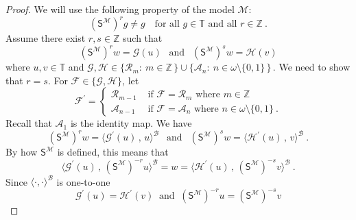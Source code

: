 \documentclass[10pt,a4paper, openany,  oldfontcommands]{memoir}
\newtheorem{open problem} [theorem] {Open Problem}
\newtheorem{open question} [theorem] {Open Question}
\renewcommand{\mathrm}{\mathsf}
\begin{document}
\begin{proof}
 
 We will use the following property of the model  $  \mathcal{M} $: 
 \[
  \left(   \mathrm{S}^{  \mathcal{M}  }  \right)^r    g   \neq   g  
 \      \       \      \mbox{  for all }   g  \in  \mathbb{T} 
  \mbox{  and    all }   r  \in  \mathbb{Z}
  \         .      \tag{*}  
 \]
Assume  there exist  $  r, s  \in   \mathbb{Z}  $    such that  
\[
 \left(   \mathrm{S}^{  \mathcal{M}  }  \right)^r    w   =     \mathcal{G} \left( u  \right)  
\        \      \mbox{  and  }      \       \  
 \left(   \mathrm{S}^{  \mathcal{M}  }  \right)^s    w   =     \mathcal{H} \left( v  \right)   
\]
where   $  u, v  \in  \mathbb{T}  $  and  
 $    \mathcal{G}  ,    \mathcal{H}    \in    \lbrace  \mathcal{R}_m  :   \   m  \in  \mathbb{Z}  \,   \rbrace    \cup  
  \lbrace  \mathcal{A}_n   :   \   n  \in  \omega  \setminus  \lbrace 0,   1   \rbrace   \,   \rbrace        \,     $.
We need to show that  $  r  =  s  $. 
For  $   \mathcal{F}  \in  \lbrace   \mathcal{G} ,   \mathcal{H}  \rbrace  $,  let  
\[
 \mathcal{F}^{  \prime  }  =  \begin{cases}
 \mathcal{R}_{ m-1}      &     \mbox{  if  }     \mathcal{F}  =  \mathcal{R}_m     \mbox{  where  }  m  \in  \mathbb{Z}
 \\
  \mathcal{A}_{ n-1}      &     \mbox{  if  }     \mathcal{F}  =  \mathcal{A}_n     \mbox{  where  }  n  \in  \omega  \setminus  \lbrace 0, 1  \rbrace
\       .
 \end{cases}
\]
Recall that  $    \mathcal{A}_{ 1}   $  is the identity  map.  
We have 
\[
 \left(   \mathrm{S}^{  \mathcal{M}  }  \right)^r    w   =   
  \langle  \mathcal{G}^{  \prime  }  \left( u  \right)    \,  ,  \,   u  \rangle^{  \mathcal{B}  }
\        \      \mbox{  and  }      \       \  
 \left(   \mathrm{S}^{  \mathcal{M}  }  \right)^s    w   =   
  \langle  \mathcal{H}^{  \prime  }  \left( u  \right)    \,  ,  \,   v  \rangle^{  \mathcal{B}  }
\       .
\]
By how    $   \mathrm{S}^{  \mathcal{M}  }   $  is defined,  
this means that  
\[
  \langle  \mathcal{G}^{  \prime  }  \left( u  \right)    \,  ,  \,   \left(   \mathrm{S}^{  \mathcal{M}  }  \right)^{-r}  u  \rangle^{  \mathcal{B}  }
  = 
  w 
   = 
     \langle  \mathcal{H}^{  \prime  }  \left( u  \right)    \,  ,  \,    \left(   \mathrm{S}^{  \mathcal{M}  }  \right)^{-s}   v  \rangle^{  \mathcal{B}  }
\      .
\]
Since  $  \langle  \cdot  ,  \cdot    \rangle^{  \mathcal{B}  }  $  is one-to-one 
\[
 \mathcal{G}^{  \prime  }  \left( u  \right)    =     \mathcal{H}^{  \prime  }  \left( v  \right)    
 \        \mbox{  and   }     \   
 \left(   \mathrm{S}^{  \mathcal{M}  }  \right)^{-r}  u     =      \left(   \mathrm{S}^{  \mathcal{M}  }  \right)^{-s}   v  
\]
\end{proof}
\end{document}
